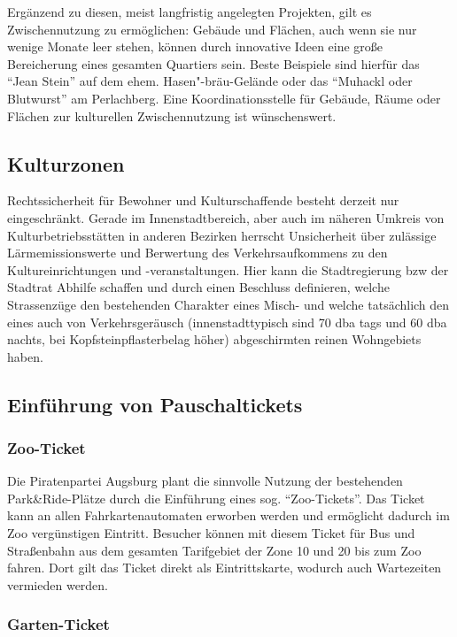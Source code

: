   Ergänzend zu diesen, meist langfristig angelegten Projekten, gilt es 
  Zwischennutzung zu ermöglichen: Gebäude und Flächen, auch wenn sie nur 
  wenige Monate leer stehen, können durch innovative Ideen eine große 
  Bereicherung eines gesamten Quartiers sein. Beste Beispiele sind hierfür 
  das "`Jean Stein"' auf dem ehem. Hasen"-bräu-Gelände oder das "`Muhackl oder 
  Blutwurst"' am Perlachberg. Eine Koordinationsstelle für Gebäude, Räume oder 
  Flächen zur kulturellen Zwischennutzung ist wünschenswert.
  
  \subsection{Kulturzonen}
  
  Rechtssicherheit für Bewohner und Kulturschaffende besteht derzeit nur 
  eingeschränkt. Gerade im Innenstadtbereich, aber auch im näheren Umkreis 
  von Kulturbetriebsstätten in anderen Bezirken herrscht Unsicherheit über 
  zulässige Lärmemissionswerte und Berwertung des Verkehrsaufkommens zu den 
  Kultureinrichtungen und -veranstaltungen. Hier kann die Stadtregierung bzw 
  der Stadtrat Abhilfe schaffen und durch einen Beschluss definieren, welche 
  Strassenzüge den bestehenden Charakter eines Misch- und welche tatsächlich 
  den eines auch von Verkehrsgeräusch (innenstadttypisch sind 70 dba tags und 
  60 dba nachts, bei Kopfsteinpflasterbelag höher) abgeschirmten reinen 
  Wohngebiets haben.
  
  \subsection{Einführung von Pauschaltickets}
  
  \subsubsection{Zoo-Ticket}
  
  Die Piratenpartei Augsburg plant die sinnvolle Nutzung der bestehenden 
  Park\&Ride-Plätze durch die Einführung eines sog. "`Zoo-Tickets"'. Das 
  Ticket 
  kann an allen Fahrkartenautomaten erworben werden und ermöglicht dadurch im 
  Zoo vergünstigen Eintritt. Besucher können mit diesem Ticket für Bus und 
  Straßenbahn aus dem gesamten Tarifgebiet der Zone 10 und 20 bis zum Zoo 
  fahren. Dort gilt das Ticket direkt als Eintrittskarte, wodurch auch 
  Wartezeiten vermieden werden.
  
  \subsubsection{Garten-Ticket}
  
